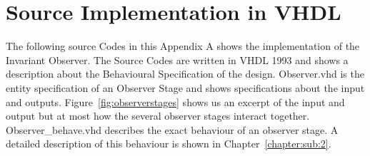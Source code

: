 \chapter{Source Implementation in VHDL} 
\label{appendix:1}
The following source Codes in this Appendix A shows the implementation of
the Invariant Observer. 
The Source Codes are written in VHDL 1993 and shows a description about the Behavioural Specification
of the design. \newline \newline
Observer.vhd is the entity specification of an Observer Stage and shows specifications about the input and outputs. 
Figure~\ref{fig:observerstages} shows us an excerpt of the input and output but at most how the several observer stages interact together.
\newline
Observer\_behave.vhd describes the exact behaviour of an observer stage. A detailed description of this behaviour is shown in  Chapter~\ref{chapter:sub:2}.
%

